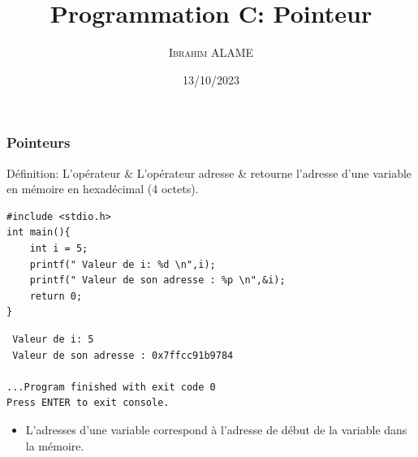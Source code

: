 \documentclass{beamer}
\title{Programmation C: Pointeur}
\author{ \textsc{Ibrahim ALAME}}\institute{ESIEE}
\date{13/10/2023}
\begin{document}
\maketitle
 \begin{frame}[fragile]
  \frametitle{Pointeurs}
  \begin{block}{Définition: L'opérateur \&}
 L'opérateur adresse \& retourne l'adresse d'une variable en mémoire en hexadécimal (4 octets).
\end{block}

\begin{verbatim}
#include <stdio.h>
int main(){ 
    int i = 5;
	printf(" Valeur de i: %d \n",i);
	printf(" Valeur de son adresse : %p \n",&i);
    return 0; 
}
\end{verbatim}
{\tiny
\begin{verbatim}
 Valeur de i: 5 
 Valeur de son adresse : 0x7ffcc91b9784 

...Program finished with exit code 0
Press ENTER to exit console.
\end{verbatim}
}
\begin{itemize}
\item L'adresses d'une variable correspond à l'adresse de début de la variable dans la mémoire.
\end{itemize}


\end{frame}
  
\end{document}
